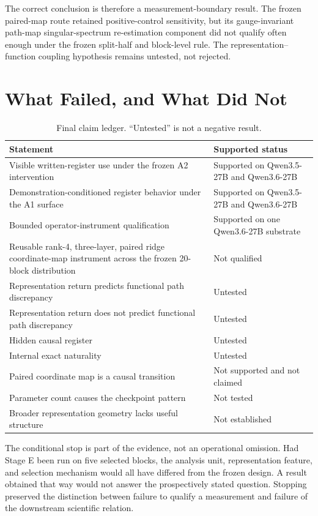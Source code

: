 \documentclass[10pt,a4paper]{article}
\begin{document}
The correct conclusion is therefore a measurement-boundary result. The frozen paired-map route retained positive-control sensitivity, but its gauge-invariant path-map singular-spectrum re-estimation component did not qualify often enough under the frozen split-half and block-level rule. The representation--function coupling hypothesis remains untested, not rejected.

\section{What Failed, and What Did Not}
\label{sec:claims}

\begin{table}[ht]
\centering
\caption{Final claim ledger. ``Untested'' is not a negative result.}
\label{tab:claim-ledger}
\begin{tabularx}{\textwidth}{@{}Yp{48mm}@{}}
\toprule
Statement & Supported status \\
\midrule
Visible written-register use under the frozen A2 intervention & Supported on Qwen3.5-27B and Qwen3.6-27B \\
Demonstration-conditioned register behavior under the A1 surface & Supported on Qwen3.5-27B and Qwen3.6-27B \\
Bounded operator-instrument qualification & Supported on one Qwen3.6-27B substrate \\
Reusable rank-4, three-layer, paired ridge coordinate-map instrument across the frozen 20-block distribution & Not qualified \\
Representation return predicts functional path discrepancy & Untested \\
Representation return does not predict functional path discrepancy & Untested \\
Hidden causal register & Untested \\
Internal exact naturality & Untested \\
Paired coordinate map is a causal transition & Not supported and not claimed \\
Parameter count causes the checkpoint pattern & Not tested \\
Broader representation geometry lacks useful structure & Not established \\
\bottomrule
\end{tabularx}
\end{table}

The conditional stop is part of the evidence, not an operational omission. Had Stage E been run on five selected blocks, the analysis unit, representation feature, and selection mechanism would all have differed from the frozen design. A result obtained that way would not answer the prospectively stated question. Stopping preserved the distinction between failure to qualify a measurement and failure of the downstream scientific relation.
\end{document}
